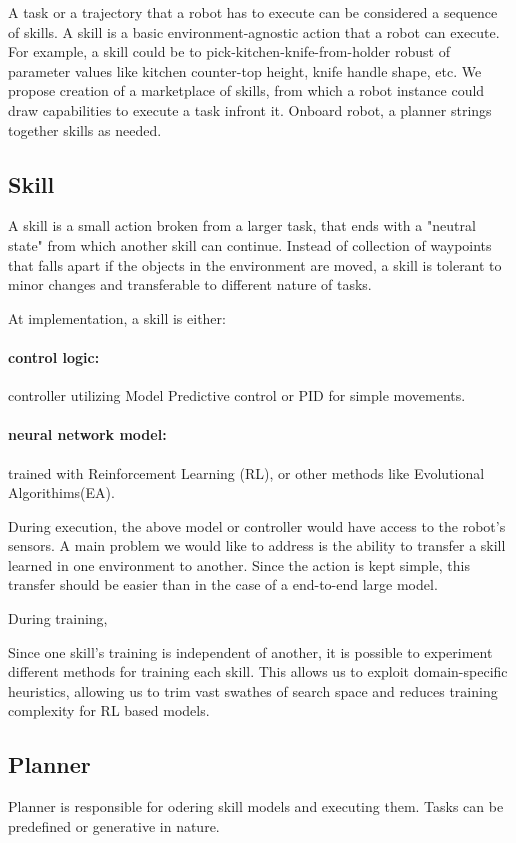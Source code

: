 
A task or a trajectory that a robot has to execute can be considered a sequence of skills. A skill is a basic environment-agnostic action that a robot can execute. For example, a skill could be to pick-kitchen-knife-from-holder robust of parameter values like kitchen counter-top height, knife handle shape, etc.  
We propose creation of a marketplace of skills, from which a robot instance could draw capabilities to execute a task infront it. Onboard robot, a planner strings together skills as needed. 

\subsection{Skill}
A skill is a small action broken from a larger task, that ends with a "neutral state" from which another skill can continue.
Instead of collection of waypoints that falls apart if the objects in the environment are moved, a skill is tolerant to minor changes and transferable to different nature of tasks. 

At implementation, a skill is either:
\paragraph{control logic:} controller utilizing Model Predictive control or PID for simple movements.
\paragraph{neural network model:} trained with Reinforcement Learning (RL), or other methods like Evolutional Algorithims(EA).

During execution, the above model or controller would have access to the robot's sensors. A main problem we would like to address is the ability to transfer a skill learned in one environment to another. Since the action is kept simple, this transfer should be easier than in the case of a end-to-end large model.

During training, 

Since one skill's training is independent of another, it is possible to experiment different methods for training each skill.
This allows us to exploit domain-specific heuristics, allowing us to trim vast swathes of search space and reduces training complexity for RL based models.
 
\subsection{Planner}
Planner is responsible for odering skill models and executing them. Tasks can be predefined or generative in nature.

